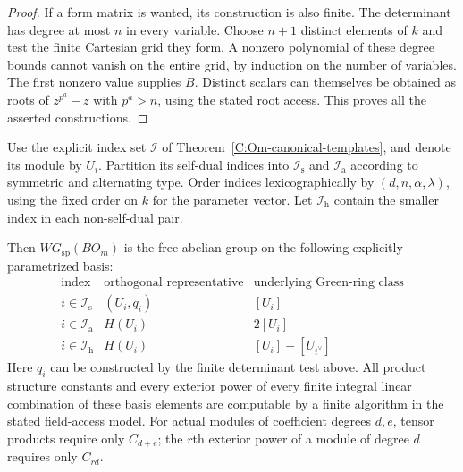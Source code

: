 \begin{proof}
If a form matrix is wanted, its construction is also finite. The
determinant has degree at most $n$ in every variable. Choose $n+1$
distinct elements of $k$ and test the finite Cartesian grid they form.
A nonzero polynomial of these degree bounds cannot vanish on the
entire grid, by induction on the number of variables. The first
nonzero value supplies $B$. Distinct scalars can themselves be obtained
as roots of $z^{p^a}-z$ with $p^a>n$, using the stated root access.
This proves all the asserted constructions.
\end{proof}

\begin{theorem}
\label{C:Om-canonical-WG}
Use the explicit index set $\mathscr I$ of
Theorem~\ref{C:Om-canonical-templates}, and denote its module by $U_i$.
Partition its self-dual indices into $\mathscr I_{\mathrm s}$ and
$\mathscr I_{\mathrm a}$ according to symmetric and alternating type.
Order indices lexicographically by $(d,n,\alpha,\lambda)$, using the fixed
order on $k$ for the parameter vector. Let $\mathscr I_{\mathrm h}$ contain
the smaller index in each non-self-dual pair.

Then $WG_{\mathrm{sp}}(BO_m)$ is the free abelian group on the following
explicitly parametrized basis:
\[
 \begin{array}{c|c|c}
 \text{index}&\text{orthogonal representative}&
       \text{underlying Green-ring class}\\ \hline
 i\in\mathscr I_{\mathrm s}&(U_i,q_i)&[U_i]\\
 i\in\mathscr I_{\mathrm a}&H(U_i)&2[U_i]\\
 i\in\mathscr I_{\mathrm h}&H(U_i)&[U_i]+[U_{i^\vee}]
 \end{array}                                             \tag{C.3.T8}
\]
Here $q_i$ can be constructed by the finite determinant test above.
All product structure constants and every exterior power of every finite
integral linear combination of these basis elements are computable by a
finite algorithm in the stated field-access model. For actual modules of
coefficient degrees $d,e$, tensor products require only $C_{d+e}$;
the $r$th exterior power of a module of degree $d$ requires only $C_{rd}$.
\end{theorem}
